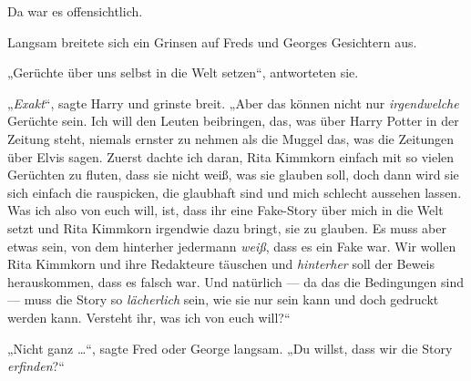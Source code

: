 Da war es offensichtlich.

Langsam breitete sich ein Grinsen auf Freds und Georges Gesichtern aus.

„Gerüchte über uns selbst in die Welt setzen“, antworteten sie.

„\emph{Exakt}“, sagte Harry und grinste breit.
„Aber das können nicht nur \emph{irgendwelche} Gerüchte sein. Ich will den Leuten beibringen, das, was über Harry Potter in der Zeitung steht, niemals ernster zu nehmen als die Muggel das, was die Zeitungen über Elvis sagen. Zuerst dachte ich daran, Rita Kimmkorn einfach mit so vielen Gerüchten zu fluten, dass sie nicht weiß, was sie glauben soll, doch dann wird sie sich einfach die rauspicken, die glaubhaft sind und mich schlecht aussehen lassen. Was ich also von euch will, ist, dass ihr eine Fake-Story über mich in die Welt setzt und Rita Kimmkorn irgendwie dazu bringt, sie zu glauben. Es muss aber etwas sein, von dem hinterher jedermann \emph{weiß}, dass es ein Fake war. Wir wollen Rita Kimmkorn und ihre Redakteure täuschen und \emph{hinterher} soll der Beweis herauskommen, dass es falsch war. Und natürlich — da das die Bedingungen sind — muss die Story so \emph{lächerlich} sein, wie sie nur sein kann und doch gedruckt werden kann. Versteht ihr, was ich von euch will?“

„Nicht ganz …“, sagte Fred oder George langsam.
„Du willst, dass wir die Story \emph{erfinden}?“

